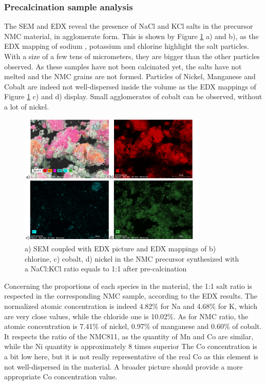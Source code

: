 \documentclass{article}
\begin{document}
 \subsubsection{Precalcination sample analysis}
 The SEM and EDX reveal the presence of NaCl and KCl salts in the precursor NMC material,
 in agglomerate form. This is shown by Figure \ref{precalc} a) and b), as the EDX mapping of sodium
, potassium and chlorine highlight the salt particles. With a size of a few tens of micrometers,
 they are bigger than the other particles observed. As these samples have not been calcinated yet,
 the salts have not melted and the NMC grains are not formed. Particles of Nickel,
 Manganese and Cobalt are indeed not well-dispersed inside the volume as the EDX mappings of Figure
 \ref{precalc} c) and d) display. Small agglomerates of cobalt can be observed, without a lot of nickel. \\
\begin{figure}[H]
  \centering
  \includegraphics[width=0.8\textwidth]{precalc.png}
  \caption{a) SEM coupled with EDX picture and EDX mappings of b) chlorine, c) cobalt, d) nickel in the NMC precursor synthesized with a NaCl:KCl ratio equals to 1:1 after pre-calcination}
  \label{precalc}
\end{figure}
Concerning the proportions of each species in the material, the 1:1 salt ratio is respected
 in the corresponding NMC sample, according to the EDX results. The normalized atomic concentration
 is indeed 4.82\% for Na and 4.68\% for K, which are very close values, while the chloride one is 10.02\%.
 As for NMC ratio, the atomic concentration is 7.41\% of nickel, 0.97\% of manganese and 0.60\% of cobalt.
 It respects the ratio of the NMC811, as the quantity of Mn and Co are similar, while the Ni quantity
 is approximately 8 times superior The Co concentration is a bit low here, but it is not really
 representative of the real Co as this element is not well-dispersed in the material. A broader 
picture should provide a more appropriate Co concentration value.\\
\end{document}
